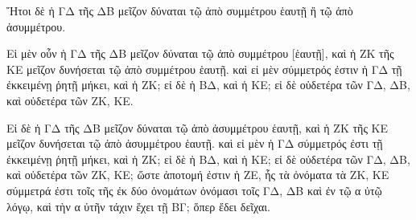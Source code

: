 \begin{Parallel}{}{}
{{\greekfont Ἤτοι δὲ ἡ ΓΔ τῆς ΔΒ μεῖζον δύναται τῷ ἀπὸ συμμέτρου
ἑαυτῇ ἢ τῷ ἀπὸ ἀσυμμέτρου.}

{\greekfont Εἰ μὲν οὖν ἡ ΓΔ τῆς ΔΒ μεῖζον δύναται τῷ ἀπὸ
συμμέτρου [ἑαυτῇ], καὶ ἡ ΖΚ τῆς ΚΕ μεῖζον
δυνήσεται τῷ ἀπὸ συμμέτρου ἑαυτῇ. καὶ εἰ μὲν
σύμμετρός ἐστιν ἡ ΓΔ τῇ ἐκκειμένῃ ῥητῇ μήκει,
καὶ ἡ ΖΚ; εἰ δὲ ἡ ΒΔ, καὶ ἡ ΚΕ; εἰ δὲ οὐδετέρα τῶν ΓΔ,
ΔΒ, καὶ οὐδετέρα τῶν ΖΚ, ΚΕ.}

{\greekfont Εἰ δὲ ἡ ΓΔ τῆς ΔΒ μεῖζον δύναται τῷ ἀπὸ ἀσυμμέτρου
ἑαυτῇ, καὶ ἡ ΖΚ τῆς  ΚΕ μεῖζον δυνήσεται τῷ ἀπὸ
ἀσυμμέτρου ἑαυτῇ. καὶ εἰ μὲν ἡ ΓΔ σύμμετρός ἐστι
τῇ ἐκκειμένῃ ῥητῇ μήκει, καὶ ἡ ΖΚ; εἰ δὲ ἡ ΒΔ, καὶ ἡ ΚΕ;
εἰ δὲ οὐδετέρα τῶν ΓΔ, ΔΒ, καὶ οὐδετέρα τῶν ΖΚ, ΚΕ;
ὥστε ἀποτομή ἐστιν ἡ ΖΕ, ἧς τὰ ὀνόματα τὰ ΖΚ, ΚΕ σύμμετρά
ἐστι τοῖς τῆς ἐκ δύο ὀνομάτων ὀνόμασι τοῖς ΓΔ, ΔΒ
καὶ ἐν τῷ α ὐτῷ λόγῳ, καὶ τὴν α ὐτῆν τάχιν ἔχει τῇ
ΒΓ; ὅπερ ἔδει δεῖχαι.}}

\end{Parallel}

